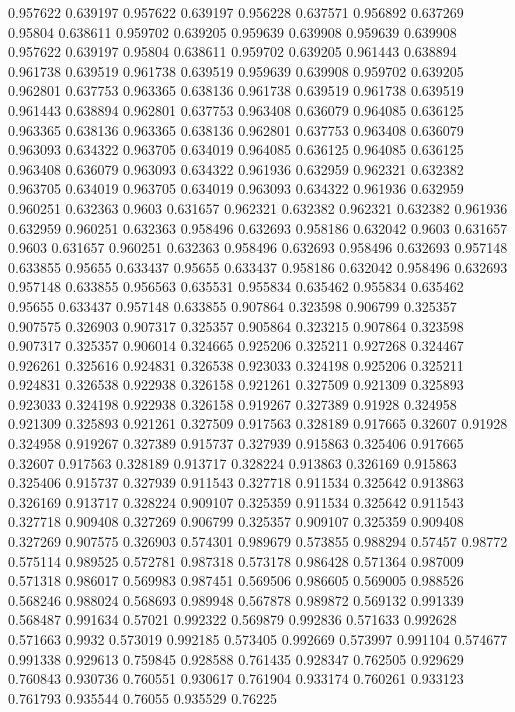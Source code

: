0.957622 0.639197
0.957622 0.639197
0.956228 0.637571
0.956892 0.637269
0.95804 0.638611
0.959702 0.639205
0.959639 0.639908
0.959639 0.639908
0.957622 0.639197
0.95804 0.638611
0.959702 0.639205
0.961443 0.638894
0.961738 0.639519
0.961738 0.639519
0.959639 0.639908
0.959702 0.639205
0.962801 0.637753
0.963365 0.638136
0.961738 0.639519
0.961738 0.639519
0.961443 0.638894
0.962801 0.637753
0.963408 0.636079
0.964085 0.636125
0.963365 0.638136
0.963365 0.638136
0.962801 0.637753
0.963408 0.636079
0.963093 0.634322
0.963705 0.634019
0.964085 0.636125
0.964085 0.636125
0.963408 0.636079
0.963093 0.634322
0.961936 0.632959
0.962321 0.632382
0.963705 0.634019
0.963705 0.634019
0.963093 0.634322
0.961936 0.632959
0.960251 0.632363
0.9603 0.631657
0.962321 0.632382
0.962321 0.632382
0.961936 0.632959
0.960251 0.632363
0.958496 0.632693
0.958186 0.632042
0.9603 0.631657
0.9603 0.631657
0.960251 0.632363
0.958496 0.632693
0.958496 0.632693
0.957148 0.633855
0.95655 0.633437
0.95655 0.633437
0.958186 0.632042
0.958496 0.632693
0.957148 0.633855
0.956563 0.635531
0.955834 0.635462
0.955834 0.635462
0.95655 0.633437
0.957148 0.633855
0.907864 0.323598
0.906799 0.325357
0.907575 0.326903
0.907317 0.325357
0.905864 0.323215
0.907864 0.323598
0.907317 0.325357
0.906014 0.324665
0.925206 0.325211
0.927268 0.324467
0.926261 0.325616
0.924831 0.326538
0.923033 0.324198
0.925206 0.325211
0.924831 0.326538
0.922938 0.326158
0.921261 0.327509
0.921309 0.325893
0.923033 0.324198
0.922938 0.326158
0.919267 0.327389
0.91928 0.324958
0.921309 0.325893
0.921261 0.327509
0.917563 0.328189
0.917665 0.32607
0.91928 0.324958
0.919267 0.327389
0.915737 0.327939
0.915863 0.325406
0.917665 0.32607
0.917563 0.328189
0.913717 0.328224
0.913863 0.326169
0.915863 0.325406
0.915737 0.327939
0.911543 0.327718
0.911534 0.325642
0.913863 0.326169
0.913717 0.328224
0.909107 0.325359
0.911534 0.325642
0.911543 0.327718
0.909408 0.327269
0.906799 0.325357
0.909107 0.325359
0.909408 0.327269
0.907575 0.326903
0.574301 0.989679
0.573855 0.988294
0.57457 0.98772
0.575114 0.989525
0.572781 0.987318
0.573178 0.986428
0.571364 0.987009
0.571318 0.986017
0.569983 0.987451
0.569506 0.986605
0.569005 0.988526
0.568246 0.988024
0.568693 0.989948
0.567878 0.989872
0.569132 0.991339
0.568487 0.991634
0.57021 0.992322
0.569879 0.992836
0.571633 0.992628
0.571663 0.9932
0.573019 0.992185
0.573405 0.992669
0.573997 0.991104
0.574677 0.991338
0.929613 0.759845
0.928588 0.761435
0.928347 0.762505
0.929629 0.760843
0.930736 0.760551
0.930617 0.761904
0.933174 0.760261
0.933123 0.761793
0.935544 0.76055
0.935529 0.76225
